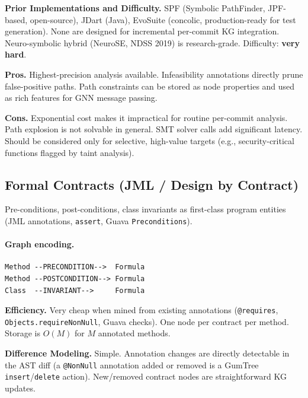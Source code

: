 \documentclass[12pt,a4paper]{article}
\begin{document}
\begin{implbox}
\textbf{Prior Implementations and Difficulty.}
SPF (Symbolic PathFinder, JPF-based, open-source), JDart (Java), EvoSuite
(concolic, production-ready for test generation). None are designed for
incremental per-commit KG integration. Neuro-symbolic hybrid (NeuroSE, NDSS
2019) is research-grade. Difficulty: \textbf{very hard}.
\end{implbox}

\begin{prosbox}
\textbf{Pros.}
Highest-precision analysis available. Infeasibility annotations directly
prune false-positive paths. Path constraints can be stored as node properties
and used as rich features for GNN message passing.
\end{prosbox}

\begin{consbox}
\textbf{Cons.}
Exponential cost makes it impractical for routine per-commit analysis.
Path explosion is not solvable in general. SMT solver calls add significant
latency. Should be considered only for selective, high-value targets (e.g.,
security-critical functions flagged by taint analysis).
\end{consbox}

\subsection{Formal Contracts (JML / Design by Contract)}

Pre-conditions, post-conditions, class invariants as first-class program
entities (JML annotations, \texttt{assert}, Guava \texttt{Preconditions}).

\paragraph{Graph encoding.}
\begin{lstlisting}
Method --PRECONDITION-->  Formula
Method --POSTCONDITION--> Formula
Class  --INVARIANT-->     Formula
\end{lstlisting}

\begin{effbox}
\textbf{Efficiency.}
Very cheap when mined from existing annotations (\texttt{@requires},
\texttt{Objects.requireNonNull}, Guava checks). One node per contract per
method. Storage is $O(M)$ for $M$ annotated methods.
\end{effbox}

\begin{diffbox}
\textbf{Difference Modeling.}
Simple. Annotation changes are directly detectable in the AST diff (a
\texttt{@NonNull} annotation added or removed is a GumTree
\texttt{insert}/\texttt{delete} action). New/removed contract nodes are
straightforward KG updates.
\end{diffbox}
\end{document}
